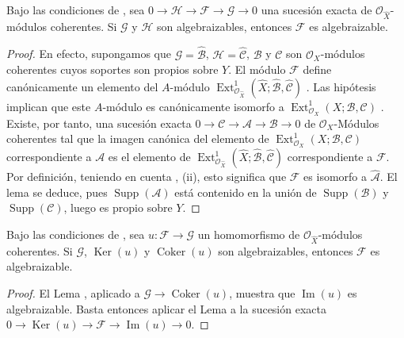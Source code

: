 \begin{lemma}[5.3.1]
\label{III.5.3.1}
\label{III.5.3.1-fr}
Bajo las condiciones de , sea
$0\to\mathcal H\to\mathcal F\to\mathcal G\to0$
una sucesión exacta de $\mathcal O_{\widehat X}$-módulos coherentes.
Si $\mathcal G$ y $\mathcal H$ son algebraizables, entonces $\mathcal F$ es
algebraizable.
\end{lemma}

\begin{proof}
En efecto, supongamos que $\mathcal G=\widehat{\mathcal B}$,
$\mathcal H=\widehat{\mathcal C}$, $\mathcal B$ y $\mathcal C$ son $\mathcal O_X$-módulos coherentes cuyos
soportes son propios sobre $Y$. El módulo $\mathcal F$ define canónicamente
un elemento del $A$-módulo
$\operatorname{Ext}^1_{\mathcal O_{\widehat X}}
(\widehat X;\widehat{\mathcal B},\widehat{\mathcal C})$
. Las hipótesis implican que este $A$-módulo es
canónicamente isomorfo a
$\operatorname{Ext}^1_{\mathcal O_X}(X;\mathcal B,\mathcal C)$
. Existe, por tanto, una sucesión exacta
$0\to\mathcal C\to\mathcal A\to\mathcal B\to0$
de $\mathcal O_X$-Módulos
coherentes tal que la imagen canónica del elemento de
$\operatorname{Ext}^1_{\mathcal O_X}(X;\mathcal B,\mathcal C)$ correspondiente a
$\mathcal A$ es el elemento de
$\operatorname{Ext}^1_{\mathcal O_{\widehat X}}
(\widehat X;\widehat{\mathcal B},\widehat{\mathcal C})$ correspondiente a
$\mathcal F$. Por definición, teniendo en cuenta
, (ii), esto significa que $\mathcal F$ es isomorfo a
$\widehat{\mathcal A}$. El lema se deduce, pues
$\operatorname{Supp}(\mathcal A)$ está contenido en la unión de
$\operatorname{Supp}(\mathcal B)$ y $\operatorname{Supp}(\mathcal C)$, luego es
propio sobre $Y$.
\end{proof}

\begin{corollary}[5.3.2]
\label{III.5.3.2}
\label{III.5.3.2-fr}
Bajo las condiciones de , sea
$u:\mathcal F\to\mathcal G$ un homomorfismo de
$\mathcal O_{\widehat X}$-módulos coherentes. Si $\mathcal G$, $\operatorname{Ker}(u)$ y
$\operatorname{Coker}(u)$ son algebraizables, entonces $\mathcal F$ es algebraizable.
\end{corollary}

\begin{proof}
El Lema , aplicado a
$\mathcal G\to\operatorname{Coker}(u)$, muestra que $\operatorname{Im}(u)$ es algebraizable. Basta entonces
aplicar el Lema  a la sucesión exacta
$0\to\operatorname{Ker}(u)\to\mathcal F\to\operatorname{Im}(u)\to0$.
\end{proof}

